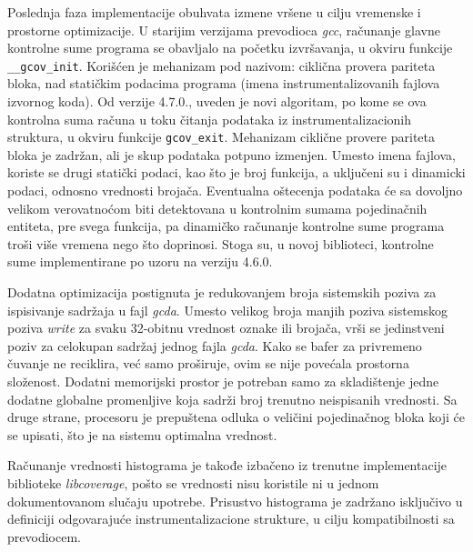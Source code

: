 \documentclass[12pt,oneside]{memoir}
\newcommand{\kod}[1]{\texttt{#1}}
\newcommand{\strano}[1]{\textit{#1}}
\begin{document}
Poslednja faza implementacije obuhvata izmene vršene u cilju vremenske i prostorne optimizacije. U starijim verzijama prevodioca \strano{gcc}, računanje glavne kontrolne sume programa se obavljalo na početku izvršavanja, u okviru funkcije \kod{\_\_gcov\_init}. Korišćen je mehanizam pod nazivom: ciklična provera pariteta bloka, nad statičkim podacima programa (imena instrumentalizovanih fajlova izvornog koda). Od verzije 4.7.0., uveden je novi algoritam, po kome se ova kontrolna suma računa u toku čitanja podataka iz instrumentalizacionih struktura, u okviru funkcije \kod{gcov\_exit}. Mehanizam ciklične provere pariteta bloka je zadržan, ali je skup podataka potpuno izmenjen. Umesto imena fajlova, koriste se drugi statički podaci, kao što je broj funkcija, a uključeni su i dinamicki podaci, odnosno vrednosti brojača. Eventualna oštecenja podataka će sa dovoljno velikom verovatnoćom biti detektovana u kontrolnim sumama pojedinačnih entiteta, pre svega funkcija, pa dinamičko računanje kontrolne sume programa troši više vremena nego što doprinosi. Stoga su, u novoj biblioteci, kontrolne sume implementirane po uzoru na verziju 4.6.0. 

Dodatna optimizacija postignuta je redukovanjem broja sistemskih poziva za ispisivanje sadržaja u fajl \strano{gcda}. Umesto velikog broja manjih poziva sistemskog poziva \strano{write} za svaku 32-obitnu vrednost oznake ili brojača, vrši se jedinstveni poziv za celokupan sadržaj jednog fajla \strano{gcda}. Kako se bafer za privremeno čuvanje ne reciklira, već samo proširuje, ovim se nije povećala prostorna složenost. Dodatni memorijski prostor je potreban samo za skladištenje jedne dodatne globalne promenljive koja sadrži broj trenutno neispisanih vrednosti. Sa druge strane, procesoru je prepuštena odluka o veličini pojedinačnog bloka koji će se upisati, što je na sistemu optimalna vrednost. 

Računanje vrednosti histograma je takođe izbačeno iz trenutne implementacije biblioteke \strano{libcoverage}, pošto se vrednosti nisu koristile ni u jednom dokumentovanom slučaju upotrebe. Prisustvo histograma je zadržano isključivo u definiciji odgovarajuće instrumentalizacione strukture, u cilju kompatibilnosti sa prevodiocem. 
\end{document}
